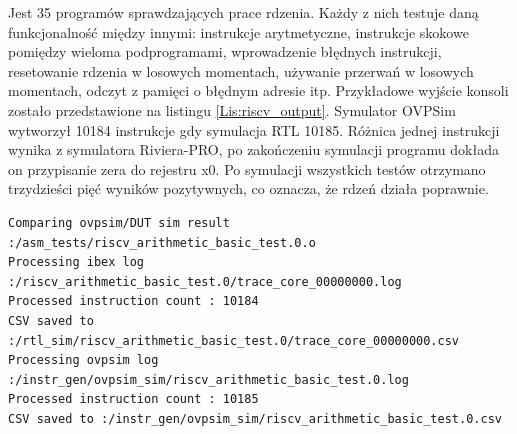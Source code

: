 \documentclass[11pt,a4paper]{article}
\begin{document}
Jest 35 programów sprawdzających prace rdzenia. Każdy z nich testuje daną funkcjonalność między innymi: instrukcje arytmetyczne, instrukcje skokowe pomiędzy wieloma podprogramami, wprowadzenie błędnych instrukcji, resetowanie rdzenia w losowych momentach, używanie przerwań w losowych momentach, odczyt z pamięci o błędnym adresie itp. Przykładowe wyjście konsoli zostało przedstawione na listingu \ref{Lis:riscv_output}. Symulator OVPSim wytworzył 10184 instrukcje gdy symulacja RTL 10185. Różnica jednej instrukcji wynika z symulatora Riviera-PRO, po zakończeniu symulacji programu dokłada on przypisanie zera do rejestru x0. Po symulacji wszystkich testów otrzymano trzydzieści pięć wyników pozytywnych, co oznacza, że rdzeń działa poprawnie.\\
	\begin{minipage}{\textwidth}
\begin{scriptsize}
\begin{lstlisting}[label=Lis:riscv_output,caption=Przykładowe porównanie]
Comparing ovpsim/DUT sim result :/asm_tests/riscv_arithmetic_basic_test.0.o
Processing ibex log :/riscv_arithmetic_basic_test.0/trace_core_00000000.log
Processed instruction count : 10184
CSV saved to :/rtl_sim/riscv_arithmetic_basic_test.0/trace_core_00000000.csv
Processing ovpsim log :/instr_gen/ovpsim_sim/riscv_arithmetic_basic_test.0.log
Processed instruction count : 10185 
CSV saved to :/instr_gen/ovpsim_sim/riscv_arithmetic_basic_test.0.csv
\end{lstlisting}
\end{scriptsize}
\end{minipage}
\end{document}
